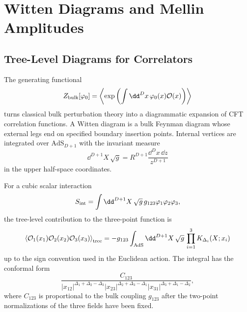 \chapter{Witten Diagrams and Mellin Amplitudes}
\label{ch:volume-iii-witten-diagrams-mellin-amplitudes}

\section{Tree-Level Diagrams for Correlators}

The generating functional
\[
  Z_{\rm bulk}[\varphi_0]
  =
  \left\langle
    \exp\left(\int\dd^Dx\,\varphi_0(x)\mathcal O(x)\right)
  \right\rangle
\]
turns classical bulk perturbation theory into a diagrammatic expansion of
CFT correlation functions.  A Witten diagram is a bulk Feynman diagram whose
external legs end on specified boundary insertion points.  Internal vertices
are integrated over \(\mathrm{AdS}_{D+1}\) with the invariant measure
\[
  \dd^{D+1}X\,\sqrt g
  =
  R^{D+1}\frac{\dd^Dx\,\dd z}{z^{D+1}}
\]
in the upper half-space coordinates.

For a cubic scalar interaction
\[
  S_{\rm int}
  =
  \int\dd^{D+1}X\,\sqrt g\,
  g_{123}\varphi_1\varphi_2\varphi_3,
\]
the tree-level contribution to the three-point function is
\begin{equation}
  \left\langle
    \mathcal O_1(x_1)\mathcal O_2(x_2)\mathcal O_3(x_3)
  \right\rangle_{\rm tree}
  =
  -g_{123}
  \int_{\mathrm{AdS}}\dd^{D+1}X\,\sqrt g\,
  \prod_{i=1}^{3}K_{\Delta_i}(X;x_i)
  \label{eq:witten-three-point-contact}
\end{equation}
up to the sign convention used in the Euclidean action.  The integral has the
conformal form
\begin{equation}
  \frac{C_{123}}
  {|x_{12}|^{\Delta_1+\Delta_2-\Delta_3}
   |x_{23}|^{\Delta_2+\Delta_3-\Delta_1}
   |x_{31}|^{\Delta_3+\Delta_1-\Delta_2}},
  \label{eq:witten-three-point-conformal-form}
\end{equation}
where \(C_{123}\) is proportional to the bulk coupling \(g_{123}\) after the
two-point normalizations of the three fields have been fixed.

